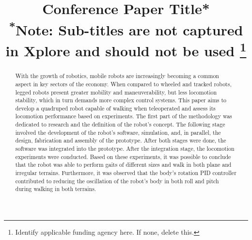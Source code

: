 \documentclass[conference]{IEEEtran}
\begin{document}
\title{Conference Paper Title*\\
{\footnotesize \textsuperscript{*}Note: Sub-titles are not captured in Xplore and
should not be used}
\thanks{Identify applicable funding agency here. If none, delete this.}
}

\author{
  \and
  \and
}

\maketitle

\begin{abstract}
  With the growth of robotics, mobile robots are increasingly becoming a common aspect in key sectors of the economy. When compared to wheeled and tracked robots, legged robots present greater mobility and maneuverability, but less locomotion stability, which in turn demands more complex control systems. This paper aims to develop a quadruped robot capable of walking when teleoperated and assess its locomotion performance based on experiments. The first part of the methodology was dedicated to research and the definition of the robot's concept. The following stage involved the development of the robot's software, simulation, and, in parallel, the design, fabrication and assembly of the prototype. After both stages were done, the software was integrated into the prototype. After the integration stage, the locomotion experiments were conducted. Based on these experiments, it was possible to conclude that the robot was able to perform gaits of different sizes and walk in both plane and irregular terrains. Furthermore, it was observed that the body's rotation PID controller contributed to reducing the oscillation of the robot's body in both roll and pitch during walking in both terrains.
\end{abstract}
\end{document}
